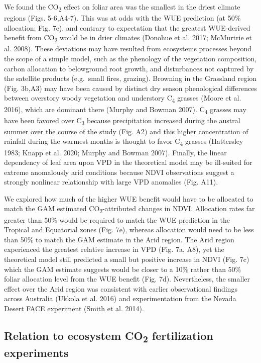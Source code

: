 \documentclass[
]{article}
\begin{document}
We found the CO\textsubscript{2} effect on foliar area was the smallest
in the driest climate regions (Figs. 5-6,A4-7). This was at odds with
the WUE prediction (at 50\% allocation; Fig. 7e), and contrary to
expectation that the greatest WUE-derived benefit from
CO\textsubscript{2} would be in drier climates (Donohue et al. 2017;
McMurtrie et al. 2008). These deviations may have resulted from
ecosystems processes beyond the scope of a simple model, such as the
phenology of the vegetation composition, carbon allocation to
belowground root growth, and disturbances not captured by the satellite
products (e.g.~small fires, grazing). Browning in the Grassland region
(Fig. 3b,A3) may have been caused by distinct dry season phenological
differences between overstory woody vegetation and understory
C\textsubscript{4} grasses (Moore et al. 2016), which are dominant there
(Murphy and Bowman 2007). C\textsubscript{4} grasses may have been
favored over C\textsubscript{3} because precipitation increased during
the austral summer over the course of the study (Fig. A2) and this
higher concentration of rainfall during the warmest months is thought to
favor C\textsubscript{4} grasses (Hattersley 1983; Knapp et al. 2020;
Murphy and Bowman 2007). Finally, the linear dependency of leaf area
upon VPD in the theoretical model may be ill-suited for extreme
anomalously arid conditions because NDVI observations suggest a strongly
nonlinear relationship with large VPD anomalies (Fig. A11).

We explored how much of the higher WUE benefit would have to be
allocated to match the GAM estimated CO\textsubscript{2}-attributed
changes in NDVI. Allocation rates far greater than 50\% would be
required to match the WUE prediction in the Tropical and Equatorial
zones (Fig. 7e), whereas allocation would need to be less than 50\% to
match the GAM estimate in the Arid region. The Arid region experienced
the greatest relative increase in VPD (Fig. 7a, A8), yet the theoretical
model still predicted a small but positive increase in NDVI (Fig. 7c)
which the GAM estimate suggests would be closer to a 10\% rather than
50\% foliar allocation level from the WUE benefit (Fig. 7d).
Nevertheless, the smaller effect over the Arid region was consistent
with earlier observational findings across Australia (Ukkola et al.
2016) and experimentation from the Nevada Desert FACE experiment (Smith
et al. 2014).

\hypertarget{relation-to-ecosystem-co2-fertilization-experiments}{%
\subsection{\texorpdfstring{Relation to ecosystem CO\textsubscript{2}
fertilization
experiments}{Relation to ecosystem CO2 fertilization experiments}}\label{relation-to-ecosystem-co2-fertilization-experiments}}
\end{document}
